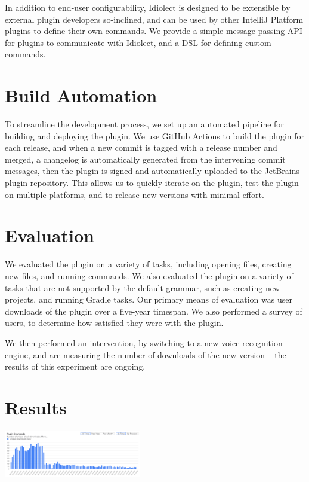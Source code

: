 \documentclass[conference]{IEEEtran}
\begin{document}
In addition to end-user configurability, Idiolect is designed to be extensible by external plugin developers so-inclined, and can be used by other IntelliJ Platform plugins to define their own commands. We provide a simple message passing API for plugins to communicate with Idiolect, and a DSL for defining custom commands.

\section{Build Automation}

To streamline the development process, we set up an automated pipeline for building and deploying the plugin. We use GitHub Actions to build the plugin for each release, and when a new commit is tagged with a release number and merged, a changelog is automatically generated from the intervening commit messages, then the plugin is signed and automatically uploaded to the JetBrains plugin repository. This allows us to quickly iterate on the plugin, test the plugin on multiple platforms, and to release new versions with minimal effort.

\section{Evaluation}

We evaluated the plugin on a variety of tasks, including opening files, creating new files, and running commands. We also evaluated the plugin on a variety of tasks that are not supported by the default grammar, such as creating new projects, and running Gradle tasks. Our primary means of evaluation was user downloads of the plugin over a five-year timespan. We also performed a survey of users, to determine how satisfied they were with the plugin.

We then performed an intervention, by switching to a new voice recognition engine, and are measuring the number of downloads of the new version -- the results of this experiment are ongoing.

\section{Results}

\includegraphics[width=0.45\textwidth]{downloads.png}
\end{document}
